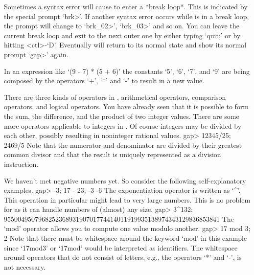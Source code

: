 %
Sometimes a syntax error will cause {\GAP} to enter a *break loop*.  This
is indicated by the special prompt `brk>'. If another syntax error occurs
while  {\GAP} is in  a break loop, the prompt  will  change to `brk_02>',
`brk_03>' and so on. You can leave the current break loop and exit to the
next outer one by either typing `quit;' or by hitting <ctl>-`D'.
Eventually {\GAP} will return to its normal state and show its normal
prompt `gap>' again.

\null

%
In an  expression like `(9  - 7) * (5 +  6)' the constants `5', `6', `7',
and `9' are being composed by the operators `+', `*' and `-' to result in
a new value.

There are  three kinds  of operators in  {\GAP}, arithmetical  operators,
comparison operators, and logical operators.  You  have already seen that
it is possible to form  the sum,  the  difference, and the product of two
integer values.  There are some  more operators applicable to integers in
{\GAP}.   Of  course integers  may  be divided  by  each other,  possibly
resulting in noninteger rational values.
\beginexample
gap> 12345/25;
2469/5 
\endexample
Note  that  the numerator and denominator  are divided by their  greatest
common divisor  and that the result is uniquely represented as a division
instruction.

We     haven't met negative numbers      yet.  So consider the  following
self-explanatory examples.
\beginexample
gap> -3; 17 - 23;
-3
-6 
\endexample
The exponentiation   operator  is  written  as  `^'. This   operation  in
particular might lead  to  very large numbers.  This  is  no problem  for
{\GAP} as it can handle numbers of (almost) any size.
\beginexample
gap> 3^132;
955004950796825236893190701774414011919935138974343129836853841 
\endexample
The `mod' operator allows you to compute one value modulo another.
\beginexample
gap> 17 mod 3;
2 
\endexample
Note  that  there must be   whitespace around the  keyword  `mod' in this
example since `17mod3' or `17mod' would be interpreted as identifiers.
The whitespace around operators that do not consist of letters, e.g.,
the operators `*' and `-', is not necessary.


